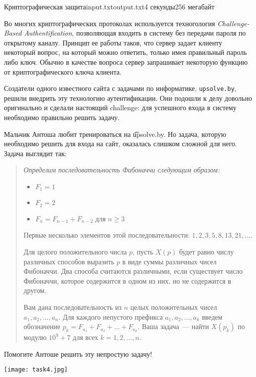 \begin{problem}{Криптографическая защита}{input.txt}{output.txt}{4 секунды}{256 мегабайт}

Во многих криптографических протоколах используется техногология \textit{Challenge-Based Authentification}, позволяющая входить в систему без передачи пароля по открытому каналу. Принцип ее работы таков, что сервер задает клиенту некоторый вопрос, на который можно ответить, только имея правильный пароль либо ключ. Обычно в качестве вопроса сервер запрашивает некоторую функцию от криптографического ключа клиента.

Создатели одного известного сайта с задачами по информатике, \texttt{upsolve.by}, решили внедрить эту технологию аутентификации. Они подошли к делу довольно оригинально и сделали настоящий challenge: для успешного входа в систему необходимо правильно решить задачу.

Мальчик Антоша любит тренироваться на \t{upsolve.by}. Но задача, которую необходимо решить для входа на сайт, оказалась слишком сложной для него. Задача выглядит так:

\begin{quote}
\it
Определим последовательность Фибоначчи следующим образом:

\begin{itemize}
	\item $F_1 = 1$
	\item $F_2 = 2$
	\item $F_n = F_{n-1} + F_{n-2}$ для $n \ge 3$
\end{itemize}

Первые несколько элементов этой последовательности: $1, 2, 3, 5, 8, 13, 21, \dots$.

Для целого положительного числа $p$, пусть $X(p)$ будет равно числу различных способов выразить $p$ в виде суммы различных чисел Фибоначчи. Два способа считаются различными, если существует число Фибоначчи, которое содержится в одном из них, но не содержится в другом.

Вам дана последовательность из $n$ целых положительных чисел $a_1, a_2, \dots, a_n$. Для каждого непустого префикса $a_1, a_2, \dots, a_k$ введем обозначение $p_k = F_{a_1} + F_{a_2} + \dots + F_{a_k}$. Ваша задача~--- найти $X(p_k)$ по модулю $10^9 + 7$ для всех $k = 1, 2, \dots, n$.
\end{quote}

Помогите Антоше решить эту непростую задачу!

\begin{center}
	\texttt{[image: task4.jpg]}
	

\end{center}
\end{problem}
